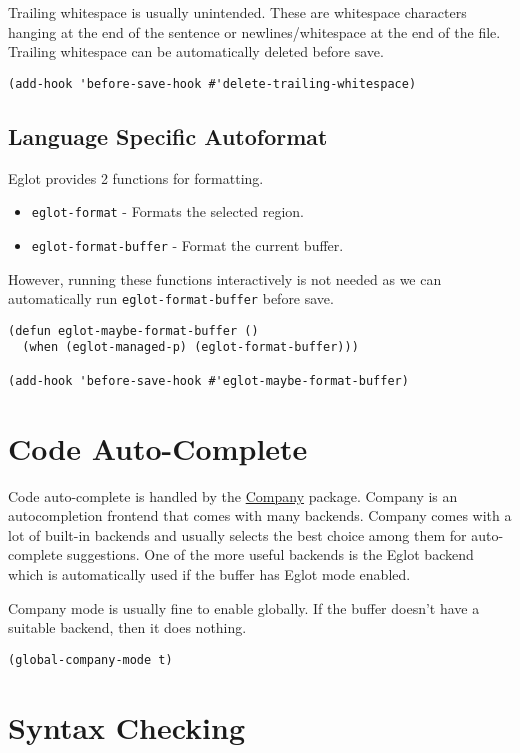 \documentclass[11pt]{article}
\begin{document}
Trailing whitespace is usually unintended. These are whitespace characters
hanging at the end of the sentence or newlines/whitespace at the end of the
file. Trailing whitespace can be automatically deleted before save.

\begin{verbatim}
(add-hook 'before-save-hook #'delete-trailing-whitespace)
\end{verbatim}
\subsection{Language Specific Autoformat}
\label{sec:org30e2cb3}

Eglot provides 2 functions for formatting.

\begin{itemize}
\item \texttt{eglot-format} - Formats the selected region.
\item \texttt{eglot-format-buffer} - Format the current buffer.
\end{itemize}

However, running these functions interactively is not needed as we can
automatically run \texttt{eglot-format-buffer} before save.

\begin{verbatim}
(defun eglot-maybe-format-buffer ()
  (when (eglot-managed-p) (eglot-format-buffer)))

(add-hook 'before-save-hook #'eglot-maybe-format-buffer)
\end{verbatim}
\section{Code Auto-Complete}
\label{sec:org1102669}

Code auto-complete is handled by the \href{https://company-mode.github.io/}{Company} package. Company is an
autocompletion frontend that comes with many backends. Company comes with a lot
of built-in backends and usually selects the best choice among them for
auto-complete suggestions. One of the more useful backends is the Eglot backend
which is automatically used if the buffer has Eglot mode enabled.

Company mode is usually fine to enable globally. If the buffer doesn't have a
suitable backend, then it does nothing.

\begin{verbatim}
(global-company-mode t)
\end{verbatim}
\section{Syntax Checking}
\label{sec:org274f533}
\end{document}
